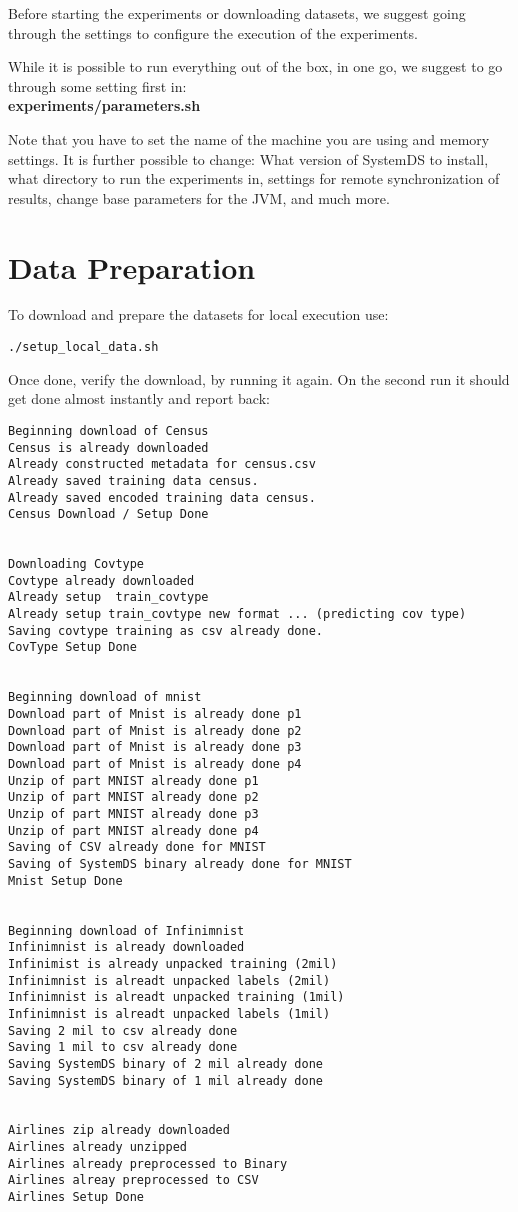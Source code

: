 \documentclass{readme}
\begin{document}
Before starting the experiments or downloading datasets,
we suggest going through the settings to configure the execution of the experiments.

While it is possible to run everything out of the box, in one go,
we suggest to go through some setting first in: \\
\textbf{experiments/parameters.sh}

Note that you have to set the name of the machine you are using and memory settings.
It is further possible to change:
What version of SystemDS to install,
what directory to run the experiments in,
settings for remote synchronization of results,  
change base parameters for the JVM, 
and much more.


\newpage

\section{Data Preparation}

To download and prepare the datasets for local execution use:


\begin{lstlisting}
./setup_local_data.sh
\end{lstlisting}

Once done, verify the download, by running it again.
On the second run it should get done almost instantly and report back:


\begin{lstlisting}
Beginning download of Census
Census is already downloaded
Already constructed metadata for census.csv
Already saved training data census.
Already saved encoded training data census.
Census Download / Setup Done


Downloading Covtype
Covtype already downloaded
Already setup  train_covtype
Already setup train_covtype new format ... (predicting cov type)
Saving covtype training as csv already done.
CovType Setup Done


Beginning download of mnist
Download part of Mnist is already done p1
Download part of Mnist is already done p2
Download part of Mnist is already done p3
Download part of Mnist is already done p4
Unzip of part MNIST already done p1
Unzip of part MNIST already done p2
Unzip of part MNIST already done p3
Unzip of part MNIST already done p4
Saving of CSV already done for MNIST
Saving of SystemDS binary already done for MNIST
Mnist Setup Done


Beginning download of Infinimnist
Infinimnist is already downloaded
Infinimist is already unpacked training (2mil)
Infinimnist is alreadt unpacked labels (2mil)
Infinimnist is alreadt unpacked training (1mil)
Infinimnist is alreadt unpacked labels (1mil)
Saving 2 mil to csv already done
Saving 1 mil to csv already done
Saving SystemDS binary of 2 mil already done
Saving SystemDS binary of 1 mil already done


Airlines zip already downloaded
Airlines already unzipped
Airlines already preprocessed to Binary
Airlines alreay preprocessed to CSV
Airlines Setup Done
\end{lstlisting}
\end{document}
